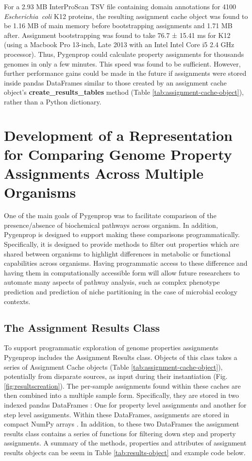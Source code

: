 For a 2.93 MB InterProScan TSV file containing domain annotations for 4100 \textit{Escherichia\ coli }K12 proteins, the resulting assignment cache object was found to be 1.16 MB of main memory before bootstrapping assignments and 1.71 MB after. Assignment bootstrapping was found to take 76.7 ± 15.41 ms for K12 (using a Macbook Pro 13-inch, Late 2013 with an Intel Intel Core i5 2.4 GHz processor). Thus, Pygenprop could calculate property assignments for thousands genomes in only a few minutes. This speed was found to be sufficient. However, further performance gains could be made in the future if assignments were stored inside pandas DataFrames \cite{mckinney2010data} similar to those created by an assignment cache object's \textbf{create\_results\_tables} method (Table \ref{tab:assignment-cache-object}), rather than a Python dictionary.

\section{Development of a Representation for Comparing Genome Property Assignments Across Multiple Organisms}

One of the main goals of Pygenprop was to facilitate comparison of the presence/absence of biochemical pathways across organism. In addition, Pygenprop is designed to support making these comparisons programmatically. Specifically, it is designed to provide methods to filter out properties which are shared between organisms to highlight differences in metabolic or functional capabilities across organisms. Having programmatic access to these difference and having them in computationally accessible form will allow future researchers to automate many aspects of pathway analysis, such as complex phenotype prediction and prediction of niche partitioning in the case of microbial ecology contexts.

\subsection{The Assignment Results Class}

To support programmatic exploration of genome properties assignments Pygenprop includes the Assignment Results class.  Objects of this class takes a series of Assignment Cache objects (Table \ref{tab:assignment-cache-object}), potentially from disparate sources, as input during their instantiation (Fig. \ref{fig:resultscreation}). The per-sample assignments found within these caches are then combined into a multiple sample form. Specifically, they are stored in two indexed pandas DataFrames \cite{mckinney2010data}: One for property level assignments and another for step level assignments. Within these DataFrames, assignments are stored in compact NumPy arrays \cite{van2011numpy}. In addition, to these two DataFrames the assignment results class contains a series of functions for filtering down step and property assignments.  A summary of the methods, properties and attributes of assignment results objects can be seem in Table \ref{tab:results-object} and example code below.

